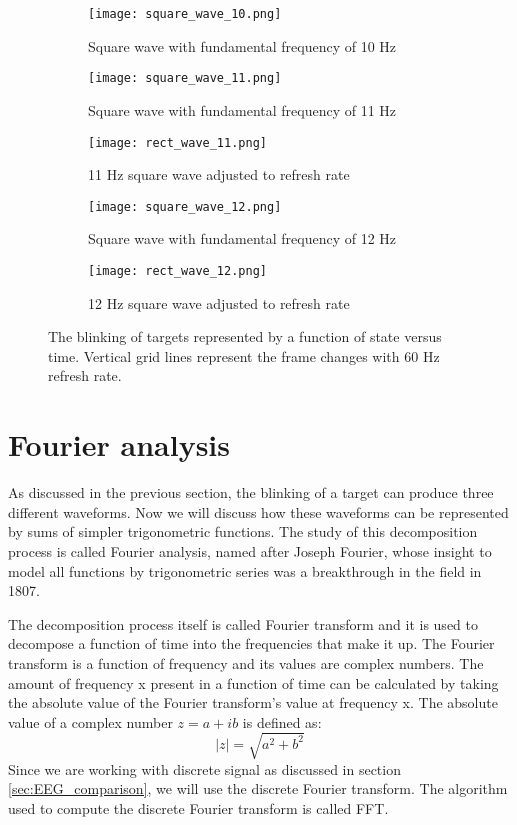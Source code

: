 \begin{figure}[h!]
	\centering
	\begin{subfigure}{\textwidth}
		\texttt{[image: square\_wave\_10.png]}
		\caption{Square wave with fundamental frequency of 10 Hz}
		\label{fig:square_10}
	\end{subfigure}\vspace{10pt}
	\begin{subfigure}{\textwidth}
		\texttt{[image: square\_wave\_11.png]}
		\caption{Square wave with fundamental frequency of 11 Hz}
		\label{fig:square_11}
	\end{subfigure}\vspace{10pt}
	\begin{subfigure}{\textwidth}
		\texttt{[image: rect\_wave\_11.png]}
		\caption{11 Hz square wave adjusted to refresh rate}
		\label{fig:rect_11}
	\end{subfigure}\vspace{10pt}
	\begin{subfigure}{\textwidth}
		\texttt{[image: square\_wave\_12.png]}
		\caption{Square wave with fundamental frequency of 12 Hz}
		\label{fig:square_12}
	\end{subfigure}\vspace{10pt}
	\begin{subfigure}{\textwidth}
		\texttt{[image: rect\_wave\_12.png]}
		\caption{12 Hz square wave adjusted to refresh rate}
		\label{fig:rect_12}
	\end{subfigure}
	\caption{The blinking of targets represented by a function of state versus time. Vertical grid lines represent the frame changes with 60 Hz refresh rate.}
	\label{fig:square_waves}
\end{figure}

\section{Fourier analysis}

As discussed in the previous section, the blinking of a target can produce three different waveforms. Now we will discuss how these waveforms can be represented by sums of simpler trigonometric functions. The study of this decomposition process is called Fourier analysis, named after Joseph Fourier, whose insight to model all functions by trigonometric series was a breakthrough in the field in 1807.

The decomposition process itself is called Fourier transform and it is used to decompose a function of time into the frequencies that make it up. The Fourier transform is a function of frequency and its values are complex numbers. The amount of frequency x present in a function of time can be calculated by taking the absolute value of the Fourier transform's value at frequency x. The absolute value of a complex number $z=a+ib$ is defined as:
\begin{equation}
	|z|=\sqrt{a^2+b^2}
\end{equation}
Since we are working with discrete signal as discussed in section \ref{sec:EEG_comparison}, we will use the discrete Fourier transform. The algorithm used to compute the discrete Fourier transform is called \gls{FFT}.

